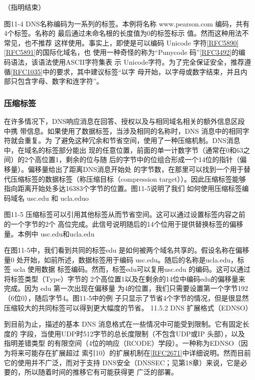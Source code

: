 （指明结束）

图11-4 DNS名称编码为一系列的标签。本例将名称
www.pearson.com 编码，共有4个标签。名称的
最后通过未命名根的长度值为0的标签标示
值。然而这种用法不常见，也不推荐
这样使用。事实上，即使是可以编码 Unicode 字符\href{https://www.rfc-editor.org/rfc/rfc5890}{[RFC5890]}\href{https://www.rfc-editor.org/rfc/rfc5891}{[RFC5891]}的国际化域名，也
使用一种奇怪的称为“Punycode 码”\href{https://www.rfc-editor.org/rfc/rfc3492}{[RFC3492]}的编码语法，该语法使用ASCII字符集表
示 Unicode字符。为了完全保证安全，推荐遵循\href{https://www.rfc-editor.org/rfc/rfc1035}{[RFC1035]}中的要求，其中建议标签“以字
母开始，以字母或数字结束，并且内部只包含字母、数字和连字符”。

\subsubsection{压缩标签}

在许多情况下，DNS响应消息在回答、授权以及与相同域名相关的额外信息区段中携
带信息。如果使用了数据标签，当涉及相同的名称时，DNS 消息中的相同字符就会重复。为
了避免这种冗余和节省空间，使用了一种压缩机制。DNS消息中，在域名的标签部分能出
现的任意位置，前面的单一计数字节（通常在0和63之间）的2个高位置1，剩余的位与随
后的字节中的位组合形成一个14位的指针（偏移量）。偏移量给出了距离DNS消息开始处
的字节数，在那里可以找到一个用于替代压缩标签的数据标签（称压缩目标（compression
target））。因此压缩标签能够指向距离开始处多达16383个字节的位置。图11-5说明了我们
如何使用压缩标签编码域名 usc.edu 和 ucla.eduo

图11-5 压缩标签可以引用其他标签从而节省空间。这可以通过设置标签内容之前的一个字节的2个
高位完成。此信号说明随后的14个位用于提供替换标签的偏移量。本例中 usc.edu和ucla.edu

在图11-5中，我们看到共同的标签edu 是如何被两个域名共享的。假设名称在偏移量0
处开始，如前所述，数据标签用于编码 usc.edu。随后的名称是ucla.edu，标签 ucla 使用数据
标签编码。然而，标签edu可以复用usc.edu 的编码。这可以通过将标签类型（Type）字节的
2个高位置1以及在剩余的14位中编码edu的偏移量来完成。因为 edu 第一次出现在偏移量
为4的位置，我们只需要设置第一个字节192（6位0），随后字节4。图11-5中的例
子只显示了节省4个字节的情况，但是很显然压缩较大的共同标签可以得到更大幅度的节省。
11.5.2 DNS 扩展格式（EDNSO）

到目前为止，描述的基本 DNS 消息格式在一些情况中可能受到限制。它有固定长度的
字段，当使用UDP时512字节的总长度限制（不包含UDP或IP 头部），以及指明差错类型
的有限空间（4位的响应（RCODE）学段）。一种称为EDNSO（因为将来可能存在扩展超过
索引10）的扩展机制在\href{https://www.rfc-editor.org/rfc/rfc2671}{[RFC2671]}中详细说明。然而目前它的使用并不广泛，而对于支持
DNS安全（DNSSEC；见第18章）来说，它是必要的，所以随着时间的推移它有可能获得更
广泛的部署。

